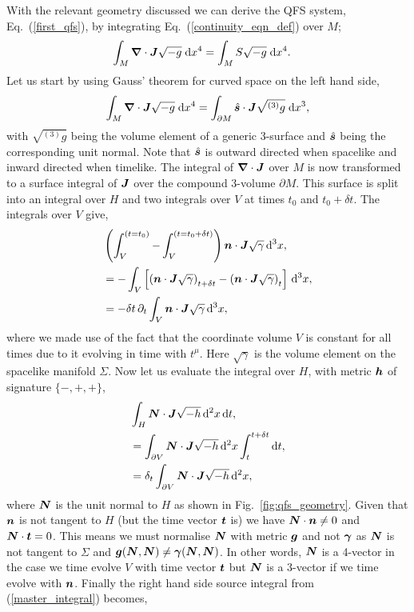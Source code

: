 With the relevant geometry discussed we can derive the QFS system, Eq.~(\ref{first_qfs}), by integrating Eq.~(\ref{continuity_eqn_def}) over $M$;
\begin{align} \label{master_integral}
\int_{M } \boldsymbol{\nabla}\cdot \boldsymbol{J} \sqrt{-g} \;\dd x^4 &= \int_{M } S \sqrt{-g} \;\dd x^4.
\end{align}
Let us start by using Gauss' theorem for curved space \cite{baumgarte_shapiro_2010} on the left hand side, 
\begin{align} \label{master_gauss}
\int_{M } \boldsymbol{\nabla}\cdot \boldsymbol{J} \sqrt{-g}\;\dd x^4  = \int_{\partial M } \hat{\boldsymbol{s}} \cdot \boldsymbol{J} \sqrt{{}^{(3)}{g}} \;\dd x^3 ,
\end{align}
with $\sqrt{{}^{(3)}g}$ being the volume element of a generic 3-surface and $\hat{\boldsymbol{s}}$ being the corresponding unit normal. Note that $\hat{\boldsymbol s}$ is outward directed when spacelike and inward directed when timelike. The integral of  $\boldsymbol{\nabla} \cdot \boldsymbol{J}$ over $M$ is now transformed to a surface integral of $\boldsymbol{J}$ over the compound 3-volume $\partial M$. This surface is split into an integral over $H$ and two integrals over $V$ at times $t_0$ and $t_0 + \delta t$. The integrals over $V$ give,
\begin{align}
&\left(\int^{(t=t_0)}_{V} - \int^{(t=t_0+\delta t)}_{V} \right)\boldsymbol{n} \cdot \boldsymbol{J} \sqrt{\gamma} \,\dd^3 x ,\nonumber \\
&=-\int_{V}\left[\left(\boldsymbol{n} \cdot \boldsymbol{J} \sqrt{\gamma}\right)_{t+\delta t} - \left(\boldsymbol{n} \cdot \boldsymbol{J} \sqrt{\gamma}\right)_{t}\right] \,\dd^3 x, \\
\label{q_int}&=-\delta t\,\partial_t \int_{V} \boldsymbol{n} \cdot \boldsymbol{J} \sqrt{\gamma}\,\dd^3 x ,
\end{align} 
where we made use of the fact that the coordinate volume $V$ is constant for all times due to it evolving in time with $t^\mu$. Here $\sqrt{\gamma}$ is the volume element on the spacelike manifold $\Sigma$. Now let us evaluate the integral over $H$, with metric $\boldsymbol{h}$ of signature $\{-,+,+\}$,
\begin{align} 
&\int_{H} \boldsymbol{N} \cdot \boldsymbol{J} \sqrt{-h} \,\dd^2 x\,\dd t, \nonumber \\
&=\int_{\partial V}  \boldsymbol{N} \cdot \boldsymbol{J} \sqrt{-h} \,\dd^2 x\int_t^{t+\delta t}\dd t, \\
\label{f_int}&=\delta_t \int_{\partial V} \boldsymbol{N} \cdot \boldsymbol{J} \sqrt{-h} \,\dd^2 x,
\end{align}
where $\boldsymbol{N}$ is the unit normal to $H$ as shown in Fig.~\ref{fig:qfs_geometry}. Given that $\boldsymbol{n}$ is not tangent to $H$ (but the time vector $\boldsymbol{t}$ is) we have $\boldsymbol{N} \cdot \boldsymbol{n} \neq 0$ and $\boldsymbol{N} \cdot \boldsymbol{t} =0$. This means we must normalise $\boldsymbol{N}$ with metric $\boldsymbol{g}$ and not $\boldsymbol{\gamma}$ as $\boldsymbol{N}$ is not tangent to $\Sigma$ and $\boldsymbol{g}(\boldsymbol{N},\boldsymbol{N})\neq \boldsymbol{\gamma}(\boldsymbol{N},\boldsymbol{N})$. In other words, $\boldsymbol{N}$ is a 4-vector in the case we time evolve $V$ with time vector $\boldsymbol{t}$ but $\boldsymbol{N}$ is a 3-vector if we time evolve with $\boldsymbol{n}$. Finally the right hand side source integral from (\ref{master_integral}) becomes,
